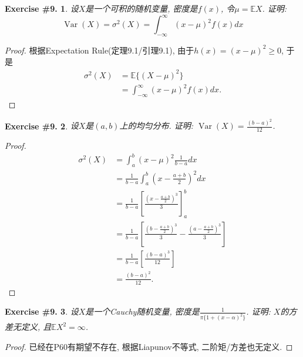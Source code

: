 \documentclass[UTF8, a4paper]{article}
\newtheorem{exercise}{Exercise \#9.}
\begin{document}
\begin{framed}

\begin{exercise}
设\(X\)是一个可积的随机变量, 密度是\(f(x)\), 令\(\mu = \mathbb{E}X\). 证明:
$$
\operatorname{Var}(X)=\sigma^2(X)=\int_{-\infty}^{\infty}(x-\mu)^2 f(x) d x
$$
\end{exercise}
\end{framed}

\begin{proof}
根据Expectation Rule(定理9.1/引理9.1), 
由于\(h(x) = (x-\mu)^2 \geq 0\), 于是
$$
\begin{aligned}
    \sigma^2(X) &= \mathbb{E}\{(X-\mu)^2\} \\
    &= \int_{-\infty}^{\infty} (x-\mu)^2 f(x) dx .
\end{aligned}
$$
\end{proof}


\begin{framed}
\begin{exercise}
设\(X\)是\((a, b)\)上的均匀分布. 证明: \(\operatorname{Var}(X) = \frac{(b-a)^2}{12}\).
\end{exercise}
\end{framed}

\begin{proof}
$$
\begin{aligned}
    \sigma^2(X) &= \int_{a}^{b} (x-\mu)^2 \frac{1}{b-a} dx \\
    &= \frac{1}{b-a} \int_{a}^{b} (x-\frac{a+b}{2})^2 dx \\
    &= \frac{1}{b-a} \left[\frac{(x-\frac{a+b}{2})^3}{3}\right]_a^b \\
    &= \frac{1}{b-a} \left[\frac{(b-\frac{a+b}{2})^3}{3} - \frac{(a-\frac{a+b}{2})^3}{3}\right] \\
    &= \frac{1}{b-a} \left[\frac{(b-a)^3}{12}\right] \\
    &= \frac{(b-a)^2}{12}.
\end{aligned}   
$$
\end{proof}


\begin{framed}
\begin{exercise}
设\(X\)是一个Cauchy随机变量, 密度是\(\frac{1}{\pi\{1+(x-\alpha)^2\}}\).
证明: \(X\)的方差无定义, 且\(\mathbb{E}X^2 = \infty\).
\end{exercise}
\end{framed}

\begin{proof}
已经在P60有期望不存在, 根据Liapunov不等式, 二阶矩/方差也无定义.
\end{proof}
\end{document}
